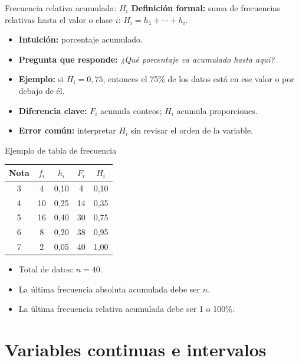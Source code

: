 \documentclass[aspectratio=169,11pt]{beamer}
\newcommand{\pregunta}[1]{\textbf{Pregunta que responde:} \emph{#1}}
\newcommand{\errorcomun}[1]{\textbf{Error común:} #1}
\newcommand{\diferencia}[1]{\textbf{Diferencia clave:} #1}
\begin{document}
\begin{frame}{Frecuencia relativa acumulada: $H_i$}
\textbf{Definición formal:} suma de frecuencias relativas hasta el valor o clase $i$: $H_i=h_1+\cdots+h_i$.
\begin{itemize}
  \item \textbf{Intuición:} porcentaje acumulado.
  \item \pregunta{¿Qué porcentaje va acumulado hasta aquí?}
  \item \textbf{Ejemplo:} si $H_i=0{,}75$, entonces el 75\% de los datos está en ese valor o por debajo de él.
  \item \diferencia{$F_i$ acumula conteos; $H_i$ acumula proporciones.}
  \item \errorcomun{interpretar $H_i$ sin revisar el orden de la variable.}
\end{itemize}
\end{frame}

\begin{frame}{Ejemplo de tabla de frecuencia}
\centering
\begin{tabular}{ccccc}
\toprule
Nota & $f_i$ & $h_i$ & $F_i$ & $H_i$ \\
\midrule
3 & 4 & 0,10 & 4 & 0,10 \\
4 & 10 & 0,25 & 14 & 0,35 \\
5 & 16 & 0,40 & 30 & 0,75 \\
6 & 8 & 0,20 & 38 & 0,95 \\
7 & 2 & 0,05 & 40 & 1,00 \\
\bottomrule
\end{tabular}
\vspace{0.6em}
\begin{itemize}
  \item Total de datos: $n=40$.
  \item La última frecuencia absoluta acumulada debe ser $n$.
  \item La última frecuencia relativa acumulada debe ser 1 o 100\%.
\end{itemize}
\end{frame}

\section{Variables continuas e intervalos}
\end{document}
